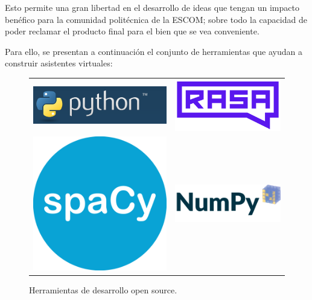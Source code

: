 Esto permite una gran libertad en el desarrollo de ideas que tengan un impacto benéfico para la comunidad politécnica de la ESCOM; sobre todo la capacidad de poder reclamar el producto final para el bien que se vea conveniente.

Para ello, se presentan a continuación el conjunto de herramientas que ayudan a construir asistentes virtuales:

\begin{figure}[ht]
    \centering
    \begin{tabular}{c c}
        \includegraphics[scale=0.7]{images/3/python.png} & \includegraphics[scale=0.5]{images/3/rasa.png} \\
        \includegraphics[scale=0.2]{images/3/spacy.png} & \includegraphics[scale=0.5]{images/3/numpy.png}
    \end{tabular}
    \caption{Herramientas de desarrollo open source.}
    \label{fig:open-source}
\end{figure}

